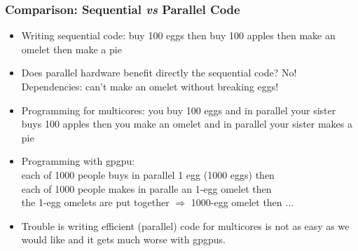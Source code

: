 \documentclass{beamer}
\renewcommand{\emph}[1]{\textcolor{structure}{#1}}
\newcommand{\emp}[1]{\textcolor{DikuRed}{ #1}}
\begin{document}
\begin{frame}
  \frametitle{Comparison: Sequential {\em vs} Parallel Code} %

\begin{itemize}
    \item Writing sequential code: 
        buy 100 eggs \alert{then} buy 100 apples \alert{then} make an omelet \alert{then} make a pie \bigskip 

    \item Does parallel hardware benefit directly the sequential code? No! \smallskip
        Dependencies: can't make an omelet without breaking eggs! \bigskip
        
    \item Programming for multicores: \smallskip
            you buy 100 eggs and \emph{in parallel} your sister buys 100 apples \smallskip
            \alert{then} you make an omelet and \emph{in parallel} your sister makes a pie \bigskip
        
    \item Programming with {\sc gpgpu}: \smallskip \\
            each of 1000 people buys \emph{in parallel} 1 egg   (1000 eggs)   \alert{then} \\ 
            each of 1000 people makes \emph{in paralle} an 1-egg omelet \alert{then} \\
            the 1-egg omelets are put together $\Rightarrow$ 1000-egg omelet \alert{then} ... \bigskip


    \item Trouble is writing efficient (parallel) code for \emp{multicores} is not as easy
            as we would like and it gets much worse with \emp{{\sc gpgpu}s}.
\end{itemize}


\end{frame}


\end{document}
